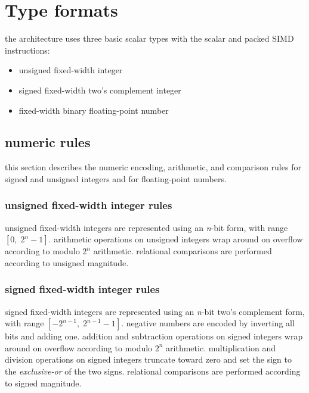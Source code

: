 \newpage
\section{Type formats}

the architecture uses three basic scalar types with the scalar and packed SIMD instructions:

\vspace{-0.3em}

\begin{itemize}[itemsep=0pt]
\item unsigned fixed-width integer
\item signed fixed-width two's complement integer
\item fixed-width binary floating-point number
\end{itemize}

\subsection{numeric rules}

this section describes the numeric encoding, arithmetic, and comparison
rules for signed and unsigned integers and for floating-point numbers.

\subsubsection{unsigned fixed-width integer rules}

unsigned fixed-width integers are represented using an \emph{n}-bit
form, with range $[0,\; 2^{n}-1]$. arithmetic operations on unsigned
integers wrap around on overflow according to modulo $2^n$ arithmetic.
relational comparisons are performed according to unsigned magnitude.

\subsubsection{signed fixed-width integer rules}

signed fixed-width integers are represented using an \emph{n}-bit
two’s complement form, with range $[-2^{n-1},\; 2^{n-1}-1]$.
negative numbers are encoded by inverting all bits and adding one.
addition and subtraction operations on signed integers wrap
around on overflow according to modulo $2^n$ arithmetic.
multiplication and division operations on signed integers truncate
toward zero and set the sign to the \emph{exclusive-or} of the two signs.
relational comparisons are performed according to signed magnitude.

